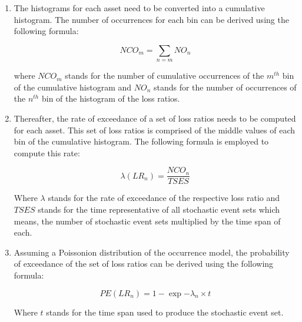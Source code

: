 \begin{enumerate}
\item The histograms for each asset need to be converted into a cumulative histogram. The number of occurrences for each bin can be derived using the following formula:

\begin{equation}
NCO_m = \sum_{n=m} NO_n
\end{equation}

where $NCO_m$ stands for the number of cumulative occurrences of the $m^{th}$ bin of the cumulative histogram and $NO_n$ stands for the number of occurrences of the $n^{th}$ bin of the histogram of the loss ratios.

\item Thereafter, the rate of exceedance of a set of loss ratios needs to be computed for each asset. This set of loss ratios is comprised of the middle values of each bin of the cumulative histogram. The following formula is employed to compute this rate:

\begin{equation}
\lambda(LR_n) = \frac{NCO_n}{TSES}
\end{equation}

Where $\lambda$ stands for the rate of exceedance of the respective loss ratio and $TSES$ stands for the time representative of all stochastic event sets which means, the number of stochastic event sets multiplied by the time span of each.

\item Assuming a Poissonion distribution of the occurrence model, the probability of exceedance of the set of loss ratios can be derived using the following formula:

\begin{equation}
PE(LR_n) = 1-\exp{-\lambda_n\times t}
\end{equation}

Where $t$ stands for the time span used to produce the stochastic event set.

\end{enumerate}

